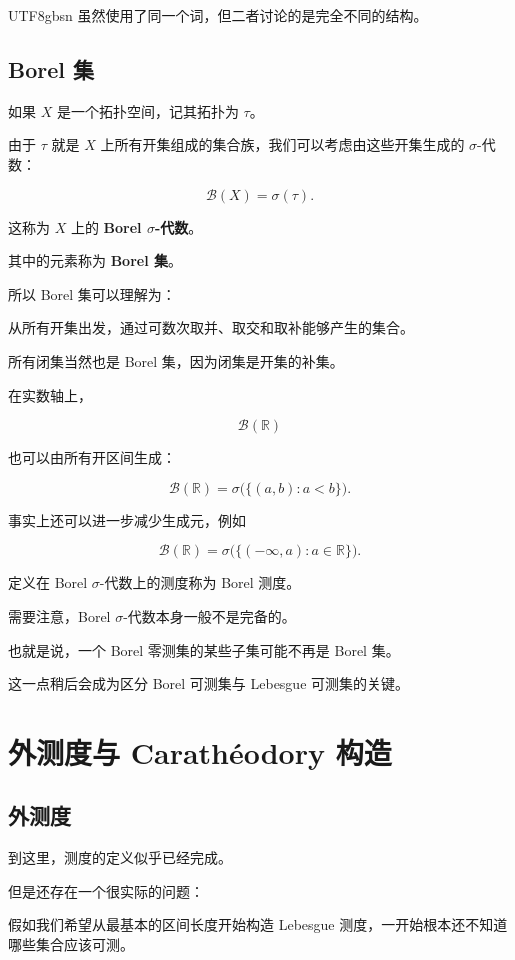 \documentclass[11pt]{article}
\begin{document}
\begin{CJK*}{UTF8}{gbsn}
虽然使用了同一个词，但二者讨论的是完全不同的结构。

\subsection{Borel 集}

如果 $X$ 是一个拓扑空间，记其拓扑为 $\tau$。

由于 $\tau$ 就是 $X$ 上所有开集组成的集合族，我们可以考虑由这些开集生成的 $\sigma$-代数：

\[
\mathcal{B}(X)=\sigma(\tau).
\]

这称为 $X$ 上的 \textbf{Borel $\sigma$-代数}。

其中的元素称为 \textbf{Borel 集}。

所以 Borel 集可以理解为：

从所有开集出发，通过可数次取并、取交和取补能够产生的集合。

所有闭集当然也是 Borel 集，因为闭集是开集的补集。

在实数轴上，

\[
\mathcal{B}(\mathbb{R})
\]

也可以由所有开区间生成：

\[
\mathcal{B}(\mathbb{R})=\sigma\big(\{(a,b):a<b\}\big).
\]

事实上还可以进一步减少生成元，例如

\[
\mathcal{B}(\mathbb{R})=\sigma\big(\{(-\infty,a):a\in\mathbb{R}\}\big).
\]

定义在 Borel $\sigma$-代数上的测度称为 Borel 测度。

需要注意，Borel $\sigma$-代数本身一般不是完备的。

也就是说，一个 Borel 零测集的某些子集可能不再是 Borel 集。

这一点稍后会成为区分 Borel 可测集与 Lebesgue 可测集的关键。

\section{外测度与 Carathéodory 构造}

\subsection{外测度}

到这里，测度的定义似乎已经完成。

但是还存在一个很实际的问题：

假如我们希望从最基本的区间长度开始构造 Lebesgue 测度，一开始根本还不知道哪些集合应该可测。


\end{CJK*}
\end{document}
